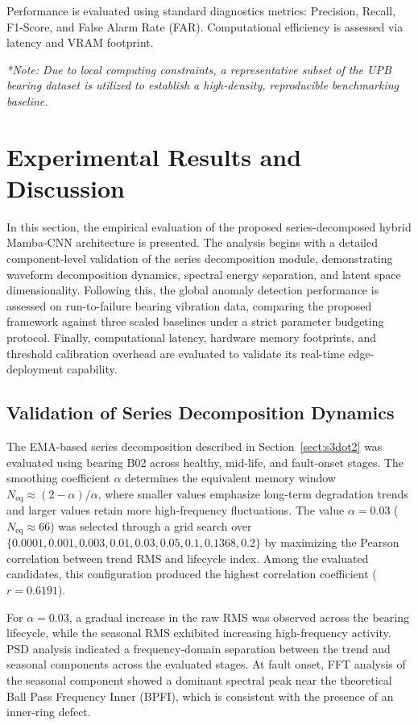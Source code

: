 \documentclass[cmes,article,submit,moreauthors,pdftex]{Definitions/tsp}
\begin{document}
Performance is evaluated using standard diagnostics metrics: Precision, Recall, F1-Score, and False Alarm Rate (FAR). Computational efficiency is assessed via latency and VRAM footprint.

\vspace{6pt}
\noindent\textit{*Note: Due to local computing constraints, a representative subset of the UPB bearing dataset is utilized to establish a high-density, reproducible benchmarking baseline.}


\section{Experimental Results and Discussion} \label{sect:s5}
In this section, the empirical evaluation of the proposed series-decomposed hybrid Mamba-CNN architecture is presented. The analysis begins with a detailed component-level validation of the series decomposition module, demonstrating waveform decomposition dynamics, spectral energy separation, and latent space dimensionality. Following this, the global anomaly detection performance is assessed on run-to-failure bearing vibration data, comparing the proposed framework against three scaled baselines under a strict parameter budgeting protocol. Finally, computational latency, hardware memory footprints, and threshold calibration overhead are evaluated to validate its real-time edge-deployment capability.
\subsection{Validation of Series Decomposition Dynamics} \label{sect:s5dot1}

The EMA-based series decomposition described in Section~\ref{sect:s3dot2} was evaluated using bearing B02 across healthy, mid-life, and fault-onset stages. The smoothing coefficient $\alpha$ determines the equivalent memory window $N_{\text{eq}} \approx (2-\alpha)/\alpha$, where smaller values emphasize long-term degradation trends and larger values retain more high-frequency fluctuations. The value $\alpha=0.03$ ($N_{\text{eq}}\approx66$) was selected through a grid search over $\{0.0001, 0.001, 0.003, 0.01, 0.03, 0.05, 0.1, 0.1368, 0.2\}$ by maximizing the Pearson correlation between trend RMS and lifecycle index. Among the evaluated candidates, this configuration produced the highest correlation coefficient ($r=0.6191$).

For $\alpha=0.03$, a gradual increase in the raw RMS was observed across the bearing lifecycle, while the seasonal RMS exhibited increasing high-frequency activity. PSD analysis indicated a frequency-domain separation between the trend and seasonal components across the evaluated stages. At fault onset, FFT analysis of the seasonal component showed a dominant spectral peak near the theoretical Ball Pass Frequency Inner (BPFI), which is consistent with the presence of an inner-ring defect.
\end{document}
